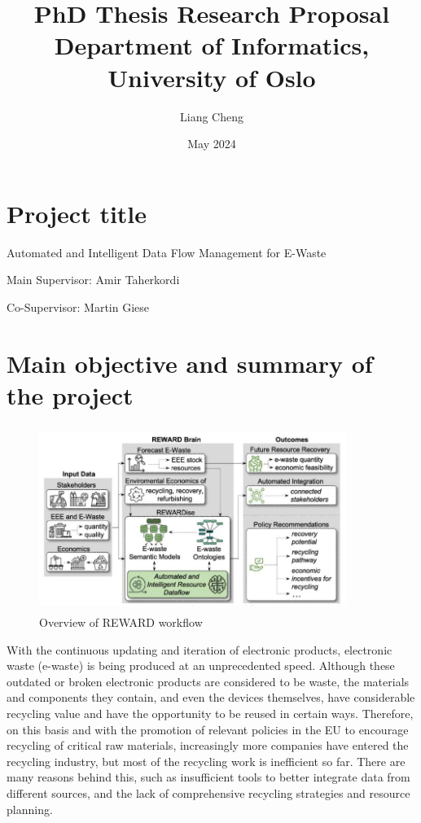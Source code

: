 \documentclass{article}
\title{PhD Thesis Research Proposal \\ Department of Informatics, University of Oslo}
\author{Liang Cheng}
\date{May 2024}
\numberwithin{equation}{section}
\begin{document}
\maketitle
\section{Project title}
Automated and Intelligent Data Flow Management for E-Waste 

Main Supervisor: Amir Taherkordi 

Co-Supervisor: Martin Giese

\section{Main objective and summary of the project}
\begin{figure}[h]
\centering
\includegraphics[height=6cm,width=10cm]{overview.png}
\caption{Overview of REWARD workflow} \label{fig:overview}
\end{figure}
With the continuous updating and iteration of electronic products, electronic waste (e-waste) is being produced at an unprecedented speed. Although these outdated or broken electronic products are considered to be waste, the materials and components they contain, and even the devices themselves, have considerable recycling value and have the opportunity to be reused in certain ways. Therefore, on this basis and with the promotion of relevant policies in the EU to encourage recycling of critical raw materials, increasingly more companies have entered the recycling industry, but most of the recycling work is inefficient so far. There are many reasons behind this, such as insufficient tools to better integrate data from different sources, and the lack of comprehensive recycling strategies and resource planning.
\end{document}
